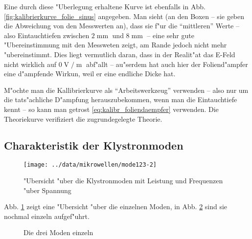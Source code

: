 \documentclass[a4paper,12pt]{article}
\begin{document}
Eine durch diese "Uberlegung erhaltene Kurve ist ebenfalls in
Abb. \ref{fig:kalibrierkurve_folie_sinus} angegeben. Man sieht (an den
Boxen -- sie geben die Abweichung von den Messwerten an),
dass sie f"ur die "`mittleren"' Werte -- also Eintauchtiefen zwischen
$2\operatorname{mm}$ und $8\operatorname{mm}$ -- eine sehr gute "Ubereinstimmung
mit den Messweten zeigt, am Rande jedoch nicht mehr
"ubereinstimmt. Dies liegt vermutlich daran, dass in der Realit"at das
E-Feld nicht wirklich auf $0 \operatorname{V}/\operatorname{m}$
abf"allt -- au"serdem hat auch hier der Foliend"ampfer eine d"ampfende
Wirkun, weil er eine endliche Dicke hat. 

M"ochte man die Kallibrierkurve als "`Arbeitswerkzeug"' verwenden --
also nur um die tats"achliche D"ampfung herauszubekommen, wenn man die
Eintauchtiefe kennt -- so kann man getrost
\eqref{eq:kalibr_foliendaempfer} verwenden. Die Theoriekurve
verifiziert die zugrundegelegte Theorie.





\subsection{Charakteristik der Klystronmoden}
\label{sec:charakteristik_der_klystronmoden}


\begin{figure}[!h]
  \centering
 \texttt{[image: ../data/mikrowellen/mode123-2]} 
  \caption{"Ubersicht "uber die Klystronmoden mit Leistung und
    Frequenzen "uber Spannung}
  \label{fig:klystronmoden_uebersicht}
\end{figure}




Abb. \ref{fig:klystronmoden_uebersicht} zeigt eine "Ubersicht
"uber die einzelnen Moden, in Abb. \ref{fig:klystronmoden_einzeln} sind sie
nochmal einzeln aufgef"uhrt.

\begin{figure}[!h]
  \centering
  \caption{Die drei Moden einzeln}
  \label{fig:klystronmoden_einzeln}
\end{figure}
\end{document}
